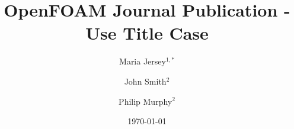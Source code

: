 \documentclass[e-only,10pt,reqno]{ofj}
\newcommand{\OF}[0]{OpenFOAM\textsuperscript{\textregistered}\xspace}
\begin{document}


\title[\OF Journal Publication  - Use Title Case]{\OF Journal Publication - Use Title Case}

\ifdefined\review
  \author{}
  \address{}
  \email{}
\else



\author[M. Jersey]{Maria Jersey$^{1,*}$}
\address{$^1$Address1}

\author[J. Smith]{John Smith$^2$}
\address{$^2$Address2} %

\author[P. Murphy]{Philip Murphy$^2$} %
\fi






\date{\today}

\dedicatory{}


\maketitle

\ifdefined\review
  \linenumbers
\else
\fi




\end{document}
